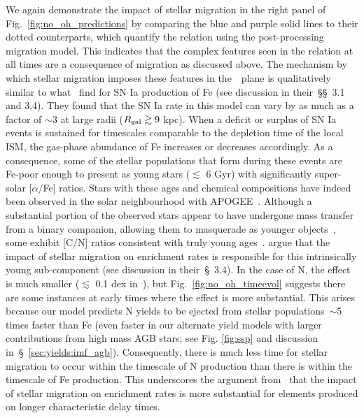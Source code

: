 \documentclass[ms.tex]{subfiles}
\begin{document}
We again demonstrate the impact of stellar migration in the right panel of
Fig.~\ref{fig:no_oh_predictions} by comparing the blue and purple solid lines
to their dotted counterparts, which quantify the relation using the
post-processing migration model.
This indicates that the complex features seen in the relation at all times are
a consequence of migration as discussed above.
The mechanism by which stellar migration imposes these features in
the~\ohno~plane is qualitatively similar to what~\citet{Johnson2021} find for
SN Ia production of Fe (see discussion in their~\S\S~3.1 and 3.4).
They found that the SN Ia rate in this model can vary by as much as a factor of
$\sim$3 at large radii ($R_\text{gal} \gtrsim 9$ kpc).
When a deficit or surplus of SN Ia events is sustained for timescales
comparable to the depletion time of the local ISM, the gas-phase abundance of
Fe increases or decreases accordingly.
As a consequence, some of the stellar populations that form during these
events are Fe-poor enough to present as young stars ($\lesssim$ 6 Gyr) with
significantly super-solar [$\alpha$/Fe] ratios.
Stars with these ages and chemical compositions have indeed been observed in
the solar neighbourhood with APOGEE~\citep{Chiappini2015, Martig2015,
Martig2016, Warfield2021}.
Although a substantial portion of the observed stars appear to have undergone
mass transfer from a binary companion, allowing them to masquerade as younger
objects~\citep{Jofre2016, Yong2016, Izzard2018, SilvaAguirre2018, Miglio2021},
some exhibit [C/N] ratios consistent with truly young ages~\citep{Hekker2019}.
\citet{Johnson2021} argue that the impact of stellar migration on enrichment
rates is responsible for this intrinsically young sub-component (see
discussion in their~\S~3.4).
In the case of N, the effect is much smaller ($\lesssim$ 0.1 dex in~\no),
but Fig.~\ref{fig:no_oh_timeevol} suggests there are some instances at early
times where the effect is more substantial.
This arises because our model predicts N yields to be ejected from stellar
populations~$\sim$5 times faster than Fe (even faster in our alternate yield
models with larger contributions from high mass AGB stars; see Fig.
\ref{fig:ssp} and discussion in~\S~\ref{sec:yields:imf_agb}).
Consequently, there is much less time for stellar migration to occur within the
timescale of N production than there is within the timescale of Fe production.
This underscores the argument from~\citet{Johnson2021} that the impact of
stellar migration on enrichment rates is more substantial for elements
produced on longer characteristic delay times.
\end{document}
